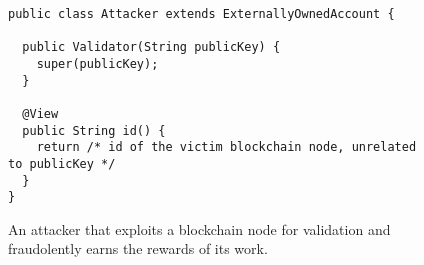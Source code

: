 \begin{figure}[t]
  \begin{center}
    \begin{lstlisting}[language=Takamaka]
public class Attacker extends ExternallyOwnedAccount {

  public Validator(String publicKey) {
    super(publicKey);
  }

  @View
  public String id() {
    return /* id of the victim blockchain node, unrelated to publicKey */
  }
}
    \end{lstlisting}
  \end{center}
  \caption{An attacker that exploits a blockchain node for validation and fraudolently earns the rewards of its work.}\label{fig:attacker}
\end{figure}

